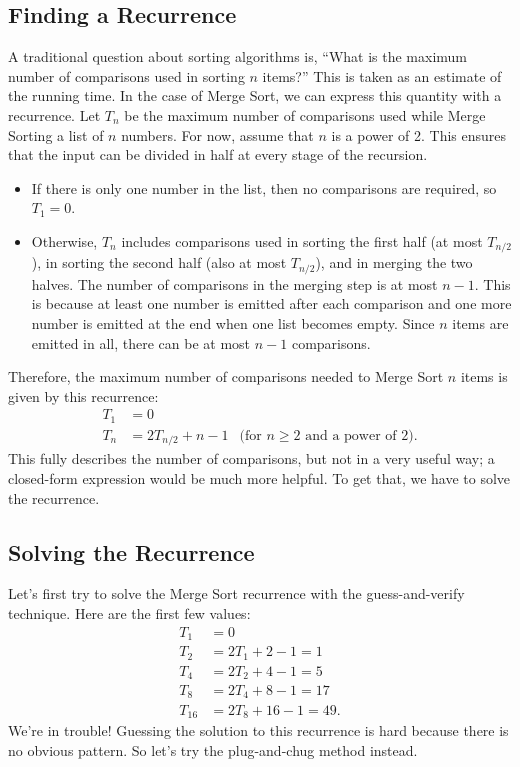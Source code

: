 \subsection{Finding a Recurrence}
A traditional question about sorting algorithms is, ``What is the
maximum number of comparisons used in sorting $n$ items?''  This is
taken as an estimate of the running time.  In the case of Merge Sort,
we can express this quantity with a recurrence.  Let $T_n$ be the
maximum number of comparisons used while Merge Sorting a list of $n$
numbers.  For now, assume that $n$ is a power of 2.  This ensures that
the input can be divided in half at every stage of the recursion.
\begin{itemize}
\item If there is only one number in the list, then no comparisons are
  required, so $T_1 = 0$.
\item Otherwise, $T_n$ includes comparisons used in sorting the first
  half (at most $T_{n/2}$), in sorting the second half (also at most
  $T_{n/2}$), and in merging the two halves.  The number of
  comparisons in the merging step is at most $n - 1$.  This is because
  at least one number is emitted after each comparison and one more
  number is emitted at the end when one list becomes empty.  Since $n$
  items are emitted in all, there can be at most $n - 1$ comparisons.
\end{itemize}
Therefore, the maximum number of comparisons needed to Merge Sort $n$
items is given by this recurrence:
\begin{align*}
T_1 & = 0 \\
T_{n} & = 2 T_{n/2} + n - 1 & \text{(for $n \geq 2$ and a power of 2)}.
\end{align*}
This fully describes the number of comparisons, but not in a very
useful way; a closed-form expression would be much more helpful.  To
get that, we have to solve the recurrence.

\subsection{Solving the Recurrence}

Let's first try to solve the Merge Sort recurrence with the
guess-and-verify technique.  Here are the first few values:
\begin{align*}
T_1 & = 0 \\
T_2 & = 2 T_1 + 2 - 1 = 1 \\
T_4 & = 2 T_2 + 4 - 1 = 5 \\
T_8 & = 2 T_4 + 8 - 1 = 17 \\
T_{16} & = 2 T_8 + 16 - 1 = 49.
\end{align*}
We're in trouble!  Guessing the solution to this recurrence is hard
because there is no obvious pattern.  So let's try the plug-and-chug
method instead.

